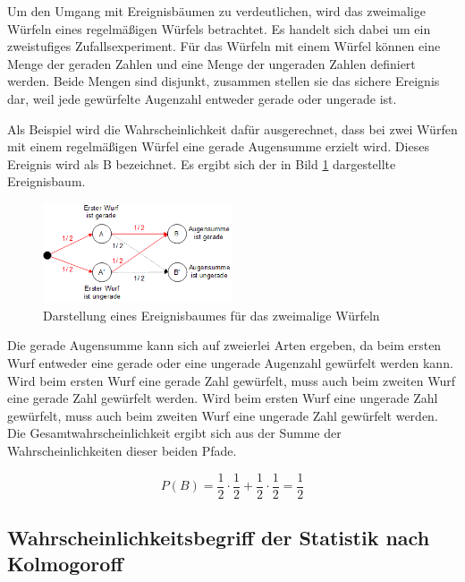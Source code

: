 \noindent Um den Umgang mit Ereignisb\"{a}umen zu verdeutlichen, wird das zweimalige W\"{u}rfeln eines regelm\"{a}{\ss}igen W\"{u}rfels betrachtet. Es handelt sich dabei um ein zweistufiges Zufallsexperiment. F\"{u}r das W\"{u}rfeln mit einem W\"{u}rfel k\"{o}nnen eine Menge der geraden Zahlen und eine Menge der ungeraden Zahlen definiert werden. Beide Mengen sind disjunkt, zusammen stellen sie das sichere Ereignis dar, weil jede gew\"{u}rfelte Augenzahl entweder gerade oder ungerade ist.

\noindent Als Beispiel wird die Wahrscheinlichkeit daf\"{u}r ausgerechnet, dass bei zwei W\"{u}rfen mit einem regelm\"{a}{\ss}igen W\"{u}rfel eine gerade Augensumme erzielt wird. Dieses Ereignis wird als B bezeichnet. Es ergibt sich der in Bild \ref{fig:EinfuehrungsbeispielEreignisbaum} dargestellte Ereignisbaum.

\noindent 
\begin{figure}[H]
  \centerline{\includegraphics[width=0.5\textwidth]{Kapitel2/Bilder/image8}}
  \caption{Darstellung eines Ereignisbaumes f\"{u}r das zweimalige W\"{u}rfeln}
  \label{fig:EinfuehrungsbeispielEreignisbaum}
\end{figure}

\noindent Die gerade Augensumme kann sich auf zweierlei Arten ergeben, da beim ersten Wurf entweder eine gerade oder eine ungerade Augenzahl gew\"{u}rfelt werden kann. Wird beim ersten Wurf eine gerade Zahl gew\"{u}rfelt, muss auch beim zweiten Wurf eine gerade Zahl gew\"{u}rfelt werden. Wird beim ersten Wurf eine ungerade Zahl gew\"{u}rfelt, muss auch beim zweiten Wurf eine ungerade Zahl gew\"{u}rfelt werden. Die Gesamtwahrscheinlichkeit ergibt sich aus der Summe der Wahrscheinlichkeiten dieser beiden Pfade.

\begin{equation}\label{eq:twothirtysix}
P(B)=\dfrac{1}{2} \cdot \dfrac{1}{2} +\dfrac{1}{2} \cdot \dfrac{1}{2} =\dfrac{1}{2}
\end{equation}

\clearpage

\subsection{Wahrscheinlichkeitsbegriff der Statistik nach Kolmogoroff}

